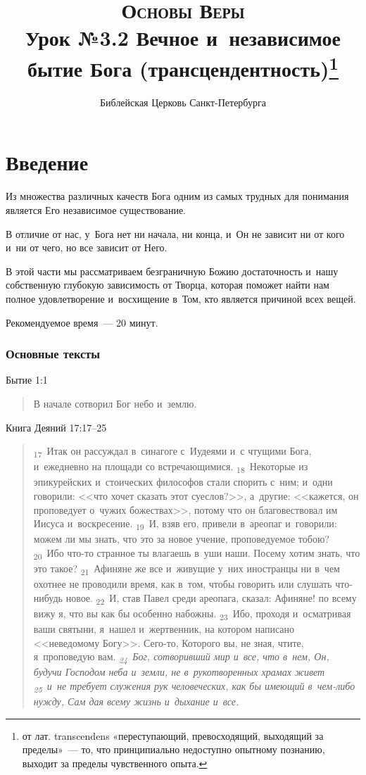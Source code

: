 \documentclass[a4paper,12pt]{article}
\title{\textsc{Основы Веры}\\Урок №3.2 Вечное и~независимое бытие Бога (трансцендентность)\footnote{от лат. transcendens «переступающий, превосходящий, выходящий за пределы»~--- то, что принципиально недоступно опытному познанию, выходит за пределы чувственного опыта.}}
\author{Библейская Церковь Санкт-Петербурга}
\date{}
\begin{document}
\maketitle

\thispagestyle{empty}

\tableofcontents



\section*{Введение}

Из множества различных качеств Бога одним из самых трудных для понимания является Его независимое существование.

В отличие от нас, у~Бога нет ни начала, ни конца, и~Он не зависит ни от кого и~ни от чего, но все зависит от Него.

В этой части мы рассматриваем безграничную Божию достаточность и~нашу собственную глубокую зависимость от Творца, которая поможет найти нам полное удовлетворение и~восхищение в~Том, кто является причиной всех вещей.

Рекомендуемое время~--- 20 минут.
        
\subsubsection*{Основные тексты}

\noindent Бытие 1:1

\begin{quote}
    В начале сотворил Бог небо и~землю.
\end{quote}

\noindent Книга Деяний 17:17--25

\begin{quote}
\textsubscript{17}~Итак он рассуждал в~синагоге с~Иудеями и~с чтущими Бога, и~ежедневно на площади со встречающимися. 
\textsubscript{18}~Некоторые из эпикурейских и~стоических философов стали спорить с~ним; и~одни говорили: <<что хочет сказать этот суеслов?>>, а~другие: <<кажется, он проповедует о~чужих божествах>>, потому что он благовествовал им Иисуса и~воскресение. 
\textsubscript{19}~И, взяв его, привели в~ареопаг и~говорили: можем ли мы знать, что это за новое учение, проповедуемое тобою? 
\textsubscript{20}~Ибо что-то странное ты влагаешь в~уши наши. Посему хотим знать, что это такое? 
\textsubscript{21}~Афиняне же все и~живущие у~них иностранцы ни в~чем охотнее не проводили время, как в~том, чтобы говорить или слушать что-нибудь новое. 
\textsubscript{22}~И, став Павел среди ареопага, сказал: Афиняне! по всему вижу я, что вы как бы особенно набожны. 
\textsubscript{23}~Ибо, проходя и~осматривая ваши святыни, я~нашел и~жертвенник, на котором написано <<неведомому Богу>>. Сего-то, Которого вы, не зная, чтите, я~проповедую вам. 
\emph{\textsubscript{24}~Бог, сотворивший мир и~все, что в~нем, Он, будучи Господом неба и~земли, не в~рукотворенных храмах живет 
\textsubscript{25}~и~не требует служения рук человеческих, как бы имеющий в~чем-либо нужду, Сам дая всему жизнь и~дыхание и~все.}
\end{quote}
\end{document}
